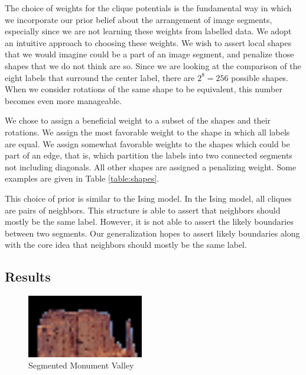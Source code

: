 \documentclass[12pt]{article}
\begin{document}
The choice of weights for the clique potentials is the fundamental way in which
we incorporate our prior belief about the arrangement of image segments,
especially since we are not learning these weights from labelled data. We adopt
an intuitive approach to choosing these weights. We wish to assert local shapes
that we would imagine could be a part of an image segment, and penalize those
shapes that we do not think are so. Since we are looking at the comparison of
the eight labels that surround the center label, there are $2^8 = 256$ possible
shapes. When we consider rotations of the same shape to be equivalent, this
number becomes even more manageable.

We chose to assign a beneficial weight to a subset of the shapes and their
rotations. We assign the most favorable weight to the shape in which all labels
are equal. We assign somewhat favorable weights to the shapes which could be
part of an edge, that is, which partition the labels into two connected
segments not including diagonals. All other shapes are assigned a penalizing
weight. Some examples are given in Table \ref{table:shapes}.

This choice of prior is similar to the Ising model. In the Ising model, all
cliques are pairs of neighbors. This structure is able to assert that neighbors
should mostly be the same label. However, it is not able to assert the likely
boundaries between two segments. Our generalization hopes to assert likely
boundaries along with the core idea that neighbors should mostly be the same
label.

\subsection*{Results}

\begin{figure}
    \begin{center}
        \includegraphics[width=2in]{results/mv_1.png}
    \end{center}
    \caption{Segmented Monument Valley}
    \label{fig:mv}
\end{figure}
\end{document}
